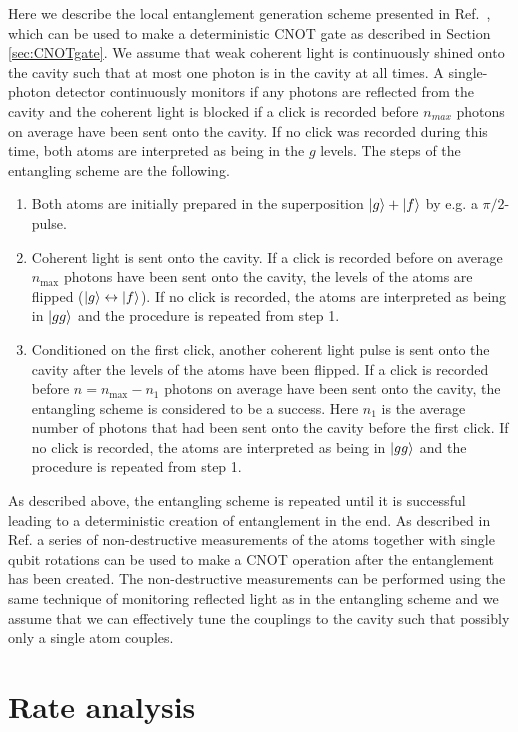 Here we describe the local entanglement generation scheme presented in
Ref.~\cite{Anders1prl}, which can be used to make a deterministic CNOT gate as
described in Section \ref{sec:CNOTgate}. We assume that weak coherent light
is continuously shined onto the cavity such that at most one photon is in the
cavity at all times. A single-photon detector continuously monitors if any
photons are reflected from the cavity and the coherent light is blocked if a
click is recorded before $n_{max}$ photons on average have been sent onto the
cavity. If no click was recorded during this time, both atoms are interpreted as
being in the $g$ levels. The steps of the entangling scheme are the following.
\begin{enumerate}
\item  Both atoms are initially prepared in the superposition $| g \rangle+| f \rangle$
by e.g. a $\pi/2$-pulse.
\item Coherent light is sent onto the cavity.  If a click is recorded before on
average $n_{\text{max}}$ photons have been sent onto the cavity, the levels of
the atoms are flipped ($| g \rangle\leftrightarrow| f \rangle$). If no click is
recorded, the atoms are interpreted as being in $| gg \rangle$ and the procedure is
repeated from step 1.
\item Conditioned on the first click, another coherent light pulse is sent onto
the cavity after the levels of the atoms have been flipped. If a click is
recorded before $n=n_{\text{max}}-n_{1}$ photons on average have been sent onto
the cavity, the entangling scheme is considered to be a success. Here $n_{1}$ is
the average number of photons that had been sent onto the cavity before the
first click. If no click is recorded, the atoms are interpreted as being in
$| gg \rangle$ and the procedure is repeated from step 1.
\end{enumerate}
As described above, the entangling scheme is repeated until it is successful leading to a deterministic creation of entanglement in the end. As described in Ref. \cite{Anders2prl} a series of non-destructive measurements of the atoms together with single qubit rotations can be used to make a CNOT operation after the entanglement has been created. The non-destructive measurements can be performed using the same technique of monitoring reflected light as in the entangling scheme and we assume that we can effectively tune the couplings to the cavity such that possibly only a single atom couples.

\section{Rate analysis} \label{app:rate}

